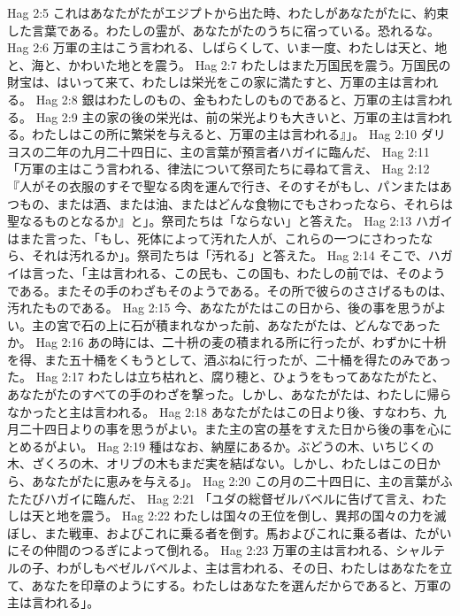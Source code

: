 Hag 2:5  これはあなたがたがエジプトから出た時、わたしがあなたがたに、約束した言葉である。わたしの霊が、あなたがたのうちに宿っている。恐れるな。
Hag 2:6  万軍の主はこう言われる、しばらくして、いま一度、わたしは天と、地と、海と、かわいた地とを震う。
Hag 2:7  わたしはまた万国民を震う。万国民の財宝は、はいって来て、わたしは栄光をこの家に満たすと、万軍の主は言われる。
Hag 2:8  銀はわたしのもの、金もわたしのものであると、万軍の主は言われる。
Hag 2:9  主の家の後の栄光は、前の栄光よりも大きいと、万軍の主は言われる。わたしはこの所に繁栄を与えると、万軍の主は言われる』」。
Hag 2:10  ダリヨスの二年の九月二十四日に、主の言葉が預言者ハガイに臨んだ、
Hag 2:11  「万軍の主はこう言われる、律法について祭司たちに尋ねて言え、
Hag 2:12  『人がその衣服のすそで聖なる肉を運んで行き、そのすそがもし、パンまたはあつもの、または酒、または油、またはどんな食物にでもさわったなら、それらは聖なるものとなるか』と」。祭司たちは「ならない」と答えた。
Hag 2:13  ハガイはまた言った、「もし、死体によって汚れた人が、これらの一つにさわったなら、それは汚れるか」。祭司たちは「汚れる」と答えた。
Hag 2:14  そこで、ハガイは言った、「主は言われる、この民も、この国も、わたしの前では、そのようである。またその手のわざもそのようである。その所で彼らのささげるものは、汚れたものである。
Hag 2:15  今、あなたがたはこの日から、後の事を思うがよい。主の宮で石の上に石が積まれなかった前、あなたがたは、どんなであったか。
Hag 2:16  あの時には、二十枡の麦の積まれる所に行ったが、わずかに十枡を得、また五十桶をくもうとして、酒ぶねに行ったが、二十桶を得たのみであった。
Hag 2:17  わたしは立ち枯れと、腐り穂と、ひょうをもってあなたがたと、あなたがたのすべての手のわざを撃った。しかし、あなたがたは、わたしに帰らなかったと主は言われる。
Hag 2:18  あなたがたはこの日より後、すなわち、九月二十四日よりの事を思うがよい。また主の宮の基をすえた日から後の事を心にとめるがよい。
Hag 2:19  種はなお、納屋にあるか。ぶどうの木、いちじくの木、ざくろの木、オリブの木もまだ実を結ばない。しかし、わたしはこの日から、あなたがたに恵みを与える」。
Hag 2:20  この月の二十四日に、主の言葉がふたたびハガイに臨んだ、
Hag 2:21  「ユダの総督ゼルバベルに告げて言え、わたしは天と地を震う。
Hag 2:22  わたしは国々の王位を倒し、異邦の国々の力を滅ぼし、また戦車、およびこれに乗る者を倒す。馬およびこれに乗る者は、たがいにその仲間のつるぎによって倒れる。
Hag 2:23  万軍の主は言われる、シャルテルの子、わがしもべゼルバベルよ、主は言われる、その日、わたしはあなたを立て、あなたを印章のようにする。わたしはあなたを選んだからであると、万軍の主は言われる」。


